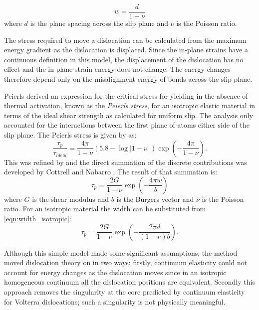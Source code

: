 \begin{equation}
w = \frac{d}{1-\nu}
\label{eqn:width_isotropic}
\end{equation}
where $d$ is the plane spacing across the slip plane and $\nu$ is the Poisson ratio.

The stress required to move a dislocation can be calculated from the maximum energy gradient as the dislocation is displaced. Since the in-plane strains have a continuous definition in this model, the displacement of the dislocation has no effect and the in-plane strain energy does not change. The energy changes therefore depend only on the misalignment energy of bonds across the slip plane.

Peierls derived an expression for the critical stress for yielding in the absence of thermal activation, known as the \emph{Peierls stress}, for an isotropic elastic material in terms of the ideal shear strength as calculated for uniform slip. The analysis only accounted for the interactions between the first plane of atoms either side of the slip plane. The Peierls stress is given by as:
\begin{equation}
\frac{\tau_p}{\tau_{ideal}} = \frac{4 \pi}{1 - \nu} (5.8 - \log|1-\nu|\,) \exp\left(-\frac{4\pi}{1 - \nu}\right).
\end{equation}
This was refined by \citet{Nabarro1947} and the direct summation of the discrete contributions was developed by Cottrell and Nabarro \cite{Cottrell1953}. The result of that summation is:
\begin{equation}
\tau_p = \frac{2G}{1-\nu} \exp\left( - \frac{4\pi w}{b} \right)
\end{equation}
where $G$ is the shear modulus and $b$ is the Burgers vector and $\nu$ is the Poisson ratio. For an isotropic material the width can be substituted from \autoref{eqn:width_isotropic}:
\begin{equation}
\tau_p = \frac{2G}{1-\nu} \exp\left( - \frac{2\pi d}{(1-\nu)b} \right).
\label{eqn:Peierls_Stress}
\end{equation}

Although this simple model made some significant assumptions, the method moved dislocation theory on in two ways: firstly, continuum elasticity could not account for energy changes as the dislocation moves since in an isotropic homogeneous continuum all the dislocation positions are equivalent. Secondly this approach removes the singularity at the core predicted by continuum elasticity for Volterra dislocations; such a singularity is not physically meaningful.


